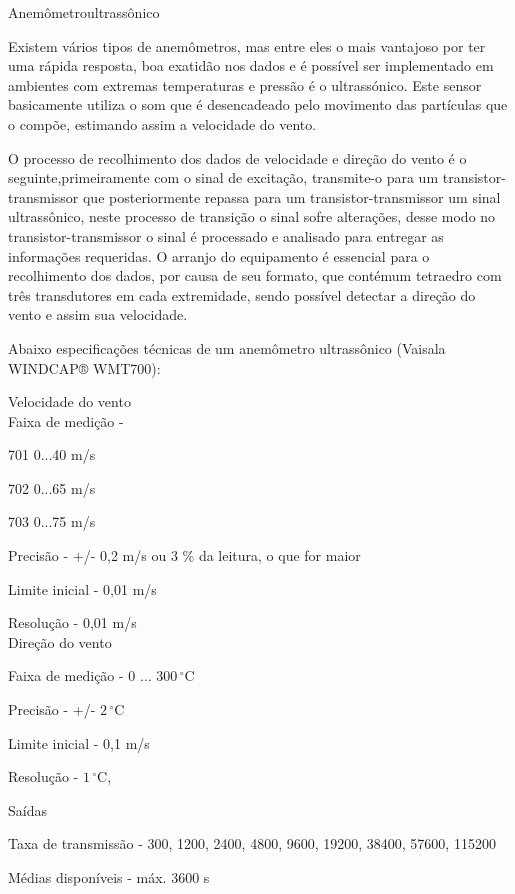 \documentclass[12pt,openright,oneside,a4paper,brazil]{abntex2}
\begin{document}
\textual
\begin{center}
 {\large Anemômetroultrassônico}\\[0.2cm]
 \end{center}
 
Existem vários tipos de anemômetros, mas entre eles o mais vantajoso por ter uma rápida resposta, boa exatidão nos dados e é possível ser implementado em ambientes com extremas temperaturas e pressão é o ultrassónico. Este sensor basicamente utiliza o som que é desencadeado pelo movimento das partículas que o compõe, estimando assim a velocidade do vento. 

O processo de recolhimento dos dados de velocidade e direção do vento é o seguinte,primeiramente com o sinal de excitação, transmite-o para um transistor-transmissor que posteriormente repassa para um transistor-transmissor um sinal ultrassônico, neste processo de transição o sinal sofre alterações, desse modo no transistor-transmissor o sinal é processado e analisado para entregar as informações requeridas. O arranjo do equipamento é essencial para o recolhimento dos dados, por causa de seu formato, que contémum tetraedro com três transdutores em cada extremidade, sendo possível detectar a direção do vento e assim sua velocidade. 

Abaixo especificações técnicas de um anemômetro ultrassônico (Vaisala WINDCAP® WMT700):

{\large Velocidade do vento}\\
Faixa de medição	- 

701	0...40 m/s

702	0...65 m/s

703	0...75 m/s

Precisão	-	+/- 0,2 m/s ou 3 \% da leitura, o que for maior

Limite inicial - 0,01 m/s

Resolução - 0,01 m/s\\

{\large Direção do vento}

Faixa de medição - 0 ... $300\,^{\circ}\mathrm{C}$

Precisão - +/- $2\,^{\circ}\mathrm{C}$

Limite inicial - 0,1 m/s

Resolução - $1\,^{\circ}\mathrm{C}$,

{\large Saídas}

Taxa de transmissão - 300, 1200, 2400, 4800, 9600, 19200, 38400, 57600, 115200

Médias disponíveis -  máx. 3600 s
\end{document}
